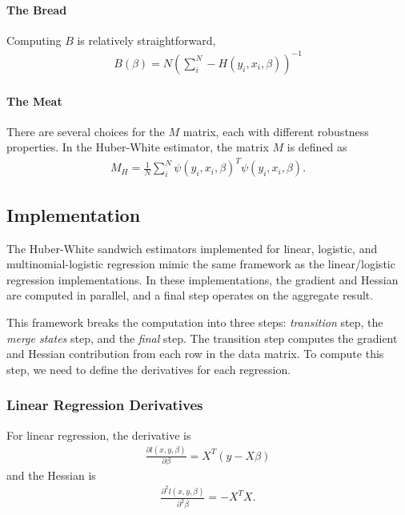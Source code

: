 \paragraph{The Bread}

Computing $B$ is relatively straightforward, 
\begin{align}
B(\beta) = N\left(\sum_i^N -H(y_i, x_i, \beta) \right)^{-1}
\end{align}

\paragraph{The Meat}

There are several choices for the $M$ matrix, each with different robustness properties.  In the Huber-White estimator, the matrix $M$ is defined as
\begin{align}
M_{H} =\frac{1}{N} \sum_i^N \psi(y_i,x_i, \beta)^T  \psi(y_i,x_i, \beta).
\end{align}


\subsection{Implementation}

The Huber-White sandwich estimators implemented for linear, logistic, and multinomial-logistic regression mimic the same framework as  the linear/logistic regression implementations.  In these implementations, the gradient and Hessian are computed in parallel, and a final step operates on the aggregate result.  

This framework breaks the computation into three steps: \textit{transition} step, the \textit{merge states} step, and the \textit{final} step.  The transition step computes the gradient and Hessian contribution from each row in the data matrix.  To compute this step, we need to define the derivatives for each regression.  
\subsubsection{Linear Regression Derivatives}
For linear regression, the derivative is 
\begin{align}
\frac{\partial l(x,y,\beta)}{\partial \beta} = X^T(y - X \beta)
\end{align}
and the Hessian is
\begin{align}
\frac{\partial^2 l(x,y,\beta)}{\partial^2 \beta} = -X^TX. 
\end{align}

